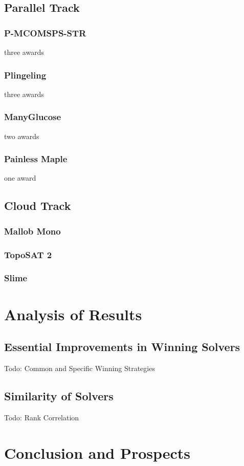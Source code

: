 \documentclass{elsarticle}
\newcommand{\todo}[1]{{\color{purple}Todo: #1}}
\begin{document}
\subsection{Parallel Track}

\subsubsection{P-MCOMSPS-STR} three awards

\subsubsection{Plingeling} three awards

\subsubsection{ManyGlucose} two awards

\subsubsection{Painless Maple} one award


\subsection{Cloud Track}

\subsubsection{Mallob Mono}

\subsubsection{TopoSAT 2}

\subsubsection{Slime}


\section{Analysis of Results}
\label{sec:analysis}

\subsection{Essential Improvements in Winning Solvers}

\todo{Common and Specific Winning Strategies}

\subsection{Similarity of Solvers}

\todo{Rank Correlation}


\section{Conclusion and Prospects}
\label{sec:conclusion}





\end{document}
